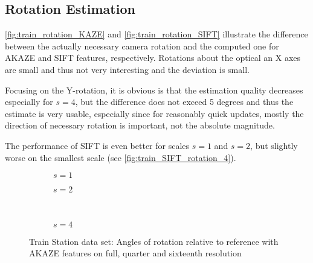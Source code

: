 \subsection{Rotation Estimation}

\autoref{fig:train_rotation_KAZE} and \autoref{fig:train_rotation_SIFT} illustrate the
difference between the actually necessary camera rotation and the computed one
for AKAZE and SIFT features, respectively. Rotations about the optical an X axes
are small and thus not very interesting and the deviation is small. 

Focusing on the Y-rotation, it is obvious is that the estimation
quality decreases especially for $s=4$, but the difference does not exceed 5
degrees and thus the estimate is very usable, especially since for reasonably
quick updates, mostly the direction of necessary rotation is important, not the
absolute magnitude.

The performance of SIFT is even better for scales $s=1$ and $s=2$, but slightly
worse on the smallest scale (see \autoref{fig:train_SIFT_rotation_4}).

\begin{figure}
   \begin{subfigure}{.5\linewidth}
      \centering      
      
      \caption{$s=1$}
      \label{fig:train_KAZE_rotation_1}
   \end{subfigure}
   \quad
   \begin{subfigure}{.5\linewidth}
      \centering      
      
      \caption{$s=2$}
      \label{fig:train_KAZE_rotation_2}
   \end{subfigure}\\[3ex]
   \begin{subfigure}{\linewidth}
      \centering      
      
      \caption{$s=4$}
      \label{fig:train_KAZE_rotation_4}
   \end{subfigure}
   \caption[Train data: Rotation AKAZE]{Train Station data set: Angles of rotation relative to reference with
   AKAZE features on full, quarter and sixteenth resolution}
   \label{fig:train_rotation_KAZE}
\end{figure}

